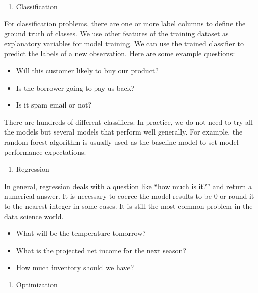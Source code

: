 \documentclass[12pt,]{krantz}
\providecommand{\tightlist}{%
  \setlength{\itemsep}{0pt}\setlength{\parskip}{0pt}}
\begin{document}
\begin{enumerate}
\def\labelenumi{\arabic{enumi}.}
\setcounter{enumi}{3}
\tightlist
\item
  Classification
\end{enumerate}

For classification problems, there are one or more label columns to define the ground truth of classes. We use other features of the training dataset as explanatory variables for model training. We can use the trained classifier to predict the labels of a new observation. Here are some example questions:

\begin{itemize}
\tightlist
\item
  Will this customer likely to buy our product?
\item
  Is the borrower going to pay us back?
\item
  Is it spam email or not?
\end{itemize}

There are hundreds of different classifiers. In practice, we do not need to try all the models but several models that perform well generally. For example, the random forest algorithm is usually used as the baseline model to set model performance expectations.

\begin{enumerate}
\def\labelenumi{\arabic{enumi}.}
\setcounter{enumi}{4}
\tightlist
\item
  Regression
\end{enumerate}

In general, regression deals with a question like ``how much is it?'' and return a numerical answer. It is necessary to coerce the model results to be 0 or round it to the nearest integer in some cases. It is still the most common problem in the data science world.

\begin{itemize}
\tightlist
\item
  What will be the temperature tomorrow?
\item
  What is the projected net income for the next season?
\item
  How much inventory should we have?
\end{itemize}

\begin{enumerate}
\def\labelenumi{\arabic{enumi}.}
\setcounter{enumi}{5}
\tightlist
\item
  Optimization
\end{enumerate}
\end{document}
